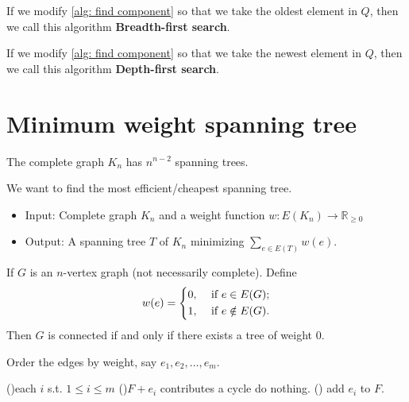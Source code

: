 
If we modify \autoref{alg: find component} so that we take the oldest element in \(Q\), then we call this algorithm \textbf{Breadth-first search}. 

If we modify \autoref{alg: find component} so that we take the newest element in \(Q\), then we call this algorithm \textbf{Depth-first search}. 

\section{Minimum weight spanning tree}
\begin{theorem}[Cayley]
    The complete graph \(K_n\) has \(n^{n-2}\) spanning trees.  
\end{theorem}

We want to find the most efficient/cheapest spanning tree. 

\begin{problem}
    \hfill 
    \begin{itemize}
        \item Input: Complete graph \(K_n\) and a weight function \(w: E(K_n) \to \mathbb{R} _{\ge 0}\)
        \item Output: A spanning tree \(T\) of \(K_n\) minimizing \(\sum_{e \in E(T)} w(e) \).     
    \end{itemize}
\end{problem}

\begin{eg}
    If \(G\) is an \(n\)-vertex graph (not necessarily complete). Define 
    \[
        w(e) = \begin{dcases}
            0, &\text{ if } e \in E(G) ;\\
            1, &\text{ if } e \notin E(G) .
        \end{dcases}
    \] 
    Then \(G\) is connected if and only if there exists a tree of weight \(0\).  
\end{eg}

\begin{algorithm}[H] \label{alg: Kruskal}
    \caption{Kruskal's algorithm(Theoretical way)}
    \DontPrintSemicolon
    Order the edges by weight, say \(e_1, e_2, \dots , e_m\). 

    \For(){each \(i\) s.t. \(1 \le i \le m\)}{
        \If(){\(F + e_i\) contributes a cycle} {
            do nothing.
        } 
        \Else() {
            add \(e_i\) to \(F\).  
        }
    }  
\end{algorithm}

